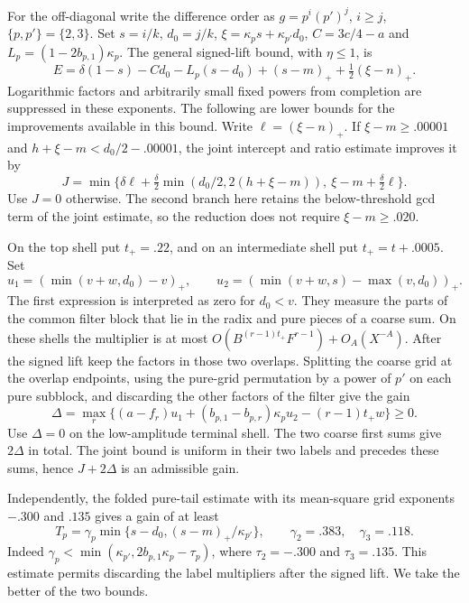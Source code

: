 \documentclass[11pt,a4paper]{article}
\theoremstyle{paperplain}
\numberwithin{equation}{section}
\begin{document}
For the off-diagonal write the difference order as
$g=p^i(p')^j$, $i\ge j$, $\{p,p'\}=\{2,3\}$. Set
$s=i/k$, $d_0=j/k$, $\xi=\kappa_p s+\kappa_{p'}d_0$,
$C=3c/4-a$ and $L_p=(1-2b_{p,1})\kappa_p$.
The general signed-lift bound, with $\eta\le1$, is
\[
 E=\delta(1-s)-C d_0-L_p(s-d_0)+(s-m)_+
                                          +\tfrac12(\xi-n)_+ .
\]
Logarithmic factors and arbitrarily small fixed powers from completion
are suppressed in these exponents. The following are lower bounds
for the improvements available in this bound. Write
$\ell=(\xi-n)_+$. If $\xi-m\ge .00001$ and
$h+\xi-m<d_0/2-.00001$, the joint intercept and ratio estimate
improves it by
\[
 J=\min\{\delta\ell+\tfrac{\delta}{2}
              \min(d_0/2,2(h+\xi-m)),\ \xi-m+\tfrac{\delta}{2}\ell\}.
\]
Use $J=0$ otherwise. The second branch here retains the
below-threshold gcd term of the joint estimate, so the reduction
does not require $\xi-m\ge .020$.

On the top shell put $t_+=.22$, and on an intermediate shell put
$t_+=t+.0005$. Set
\[
 u_1=(\min(v+w,d_0)-v)_+,\qquad
 u_2=(\min(v+w,s)-\max(v,d_0))_+ .
\]
The first expression is interpreted as zero for $d_0<v$.
They measure the parts of the common filter block that lie in
the radix and pure pieces of a coarse sum. On these shells
the multiplier is at most $O(B^{(r-1)t_+}F^{r-1})+O_A(X^{-A})$.
After the signed lift keep the factors in those two overlaps.
Splitting the coarse grid at the overlap endpoints, using the
pure-grid permutation by a power of $p'$ on each pure subblock,
and discarding the other factors of the filter give the gain
\[
 \Delta=\max_r\{(a-f_r)u_1+(b_{p,1}-b_{p,r})\kappa_p u_2
                                      -(r-1)t_+ w\}\ge0.
\]
Use $\Delta=0$ on the low-amplitude terminal shell. The two coarse
first sums give $2\Delta$ in total. The joint bound is uniform
in their two labels and precedes these sums, hence $J+2\Delta$
is an admissible gain.

Independently, the folded pure-tail estimate with its mean-square
grid exponents $-.300$ and $.135$ gives a gain of at least
\[
 T_p=\gamma_p\min\{s-d_0,(s-m)_+/\kappa_{p'}\},\qquad
                       \gamma_2=.383,\quad\gamma_3=.118 .
\]
Indeed $\gamma_p<\min(\kappa_{p'},2b_{p,1}\kappa_p-\tau_p)$,
where $\tau_2=-.300$ and $\tau_3=.135$. This estimate permits
discarding the label multipliers after the signed lift. We take
the better of the two bounds.
\end{document}

